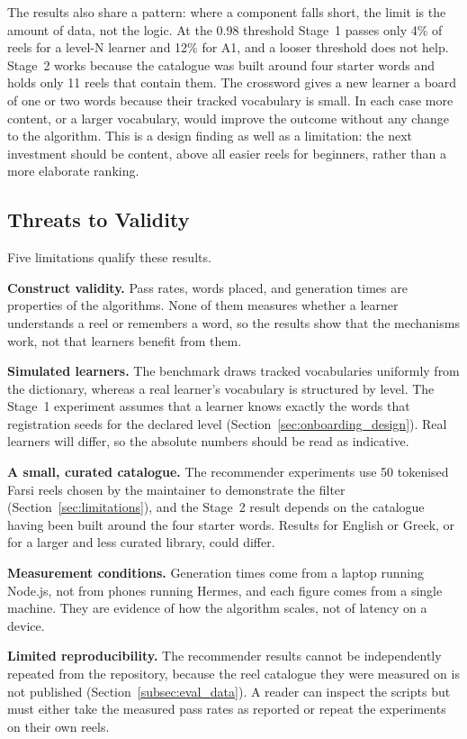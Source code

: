     \begin{sloppypar}
    The results also share a pattern: where a component falls short, the limit is the amount of data, not the logic. At the 0.98 threshold Stage~1 passes only 4\% of reels for a level-N learner and 12\% for A1, and a looser threshold does not help. Stage~2 works because the catalogue was built around four starter words and holds only 11 reels that contain them. The crossword gives a new learner a board of one or two words because their tracked vocabulary is small. In each case more content, or a larger vocabulary, would improve the outcome without any change to the algorithm. This is a design finding as well as a limitation: the next investment should be content, above all easier reels for beginners, rather than a more elaborate ranking.
    \end{sloppypar}

    \subsection{Threats to Validity}
    \label{subsec:eval_threats}
    Five limitations qualify these results.

    \textbf{Construct validity.} Pass rates, words placed, and generation times are properties of the algorithms. None of them measures whether a learner understands a reel or remembers a word, so the results show that the mechanisms work, not that learners benefit from them.

    \textbf{Simulated learners.} The benchmark draws tracked vocabularies uniformly from the dictionary, whereas a real learner's vocabulary is structured by level. The Stage~1 experiment assumes that a learner knows exactly the words that registration seeds for the declared level (Section~\ref{sec:onboarding_design}). Real learners will differ, so the absolute numbers should be read as indicative.

    \textbf{A small, curated catalogue.} The recommender experiments use 50 tokenised Farsi reels chosen by the maintainer to demonstrate the filter (Section~\ref{sec:limitations}), and the Stage~2 result depends on the catalogue having been built around the four starter words. Results for English or Greek, or for a larger and less curated library, could differ.

    \textbf{Measurement conditions.} Generation times come from a laptop running Node.js, not from phones running Hermes, and each figure comes from a single machine. They are evidence of how the algorithm scales, not of latency on a device.

    \textbf{Limited reproducibility.} The recommender results cannot be independently repeated from the repository, because the reel catalogue they were measured on is not published (Section~\ref{subsec:eval_data}). A reader can inspect the scripts but must either take the measured pass rates as reported or repeat the experiments on their own reels.
